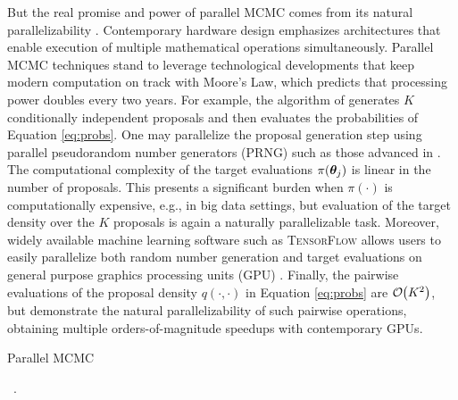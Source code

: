 \documentclass[12pt]{article} %
\newcommand{\order}[1]{{\cal O}\hspace{-0.2em}\left( #1 \right)}
\begin{document}
But the real promise and power of parallel MCMC comes from its natural parallelizability \citep{calderhead2014general}.  Contemporary hardware design emphasizes architectures that enable execution of multiple mathematical operations simultaneously. Parallel MCMC techniques stand to leverage technological developments that keep modern computation on track with Moore's Law, which predicts that processing power doubles every two years.  For example, the algorithm of \citet{tjelmeland2004using} generates $K$ conditionally independent proposals and then evaluates the probabilities of Equation \eqref{eq:probs}.  One may parallelize the proposal generation step using parallel pseudorandom number generators (PRNG) such as those advanced in \citet{salmon2011parallel}. The computational complexity of the target evaluations $\pi(\boldsymbol{\theta}_j)$ is linear in the number of proposals. This presents a significant burden when $\pi(\cdot)$ is computationally expensive, e.g., in big data settings, but evaluation of the target density over the $K$ proposals is again a naturally parallelizable task.  Moreover, widely available machine learning software such as \textsc{TensorFlow} allows users to easily parallelize both random number generation and target evaluations on general purpose graphics processing units (GPU) \citep{lao2020tfp}. Finally, the pairwise evaluations of the proposal density $q(\cdot,\cdot)$ in Equation \eqref{eq:probs} are $\order{K^2}$, but \citet{massive} demonstrate the natural parallelizability of such pairwise operations, obtaining multiple orders-of-magnitude speedups with contemporary GPUs.

\begin{algorithm}[t!]
	\caption{Parallel MCMC}\label{alg:pMCMC}
	\ .
\end{algorithm}
\end{document}

